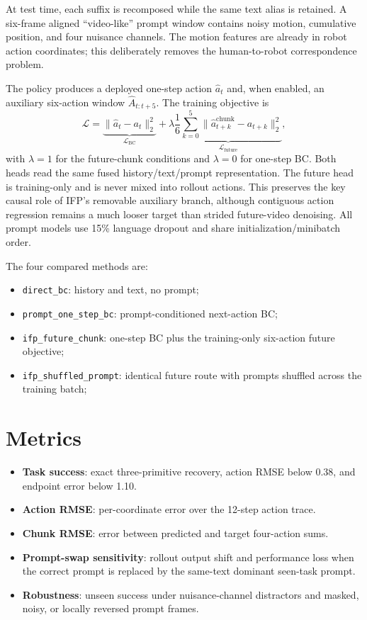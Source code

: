 \documentclass[11pt]{article}
\begin{document}
At test time, each suffix is recomposed while the same text alias is retained. A six-frame aligned ``video-like'' prompt window contains noisy motion, cumulative position, and four nuisance channels. The motion features are already in robot action coordinates; this deliberately removes the human-to-robot correspondence problem.

The policy produces a deployed one-step action $\hat a_t$ and, when enabled, an auxiliary six-action window $\hat A_{t:t+5}$. The training objective is
\begin{equation}
  \mathcal{L} = \underbrace{\|\hat a_t-a_t\|_2^2}_{\mathcal{L}_{\mathrm{BC}}}
  + \lambda\underbrace{\frac{1}{6}\sum_{k=0}^{5}\|\hat a^{\mathrm{chunk}}_{t+k}-a_{t+k}\|_2^2}_{\mathcal{L}_{\mathrm{future}}},
\end{equation}
with $\lambda=1$ for the future-chunk conditions and $\lambda=0$ for one-step BC. Both heads read the same fused history/text/prompt representation. The future head is training-only and is never mixed into rollout actions. This preserves the key causal role of IFP's removable auxiliary branch, although contiguous action regression remains a much looser target than strided future-video denoising. All prompt models use 15\% language dropout and share initialization/minibatch order.

The four compared methods are:
\begin{itemize}[leftmargin=1.5em]
  \item \texttt{direct\_bc}: history and text, no prompt;
  \item \texttt{prompt\_one\_step\_bc}: prompt-conditioned next-action BC;
  \item \texttt{ifp\_future\_chunk}: one-step BC plus the training-only six-action future objective;
  \item \texttt{ifp\_shuffled\_prompt}: identical future route with prompts shuffled across the training batch;
\end{itemize}

\section{Metrics}
\begin{itemize}[leftmargin=1.5em]
  \item \textbf{Task success}: exact three-primitive recovery, action RMSE below 0.38, and endpoint error below 1.10.
  \item \textbf{Action RMSE}: per-coordinate error over the 12-step action trace.
  \item \textbf{Chunk RMSE}: error between predicted and target four-action sums.
  \item \textbf{Prompt-swap sensitivity}: rollout output shift and performance loss when the correct prompt is replaced by the same-text dominant seen-task prompt.
  \item \textbf{Robustness}: unseen success under nuisance-channel distractors and masked, noisy, or locally reversed prompt frames.
\end{itemize}
\end{document}
